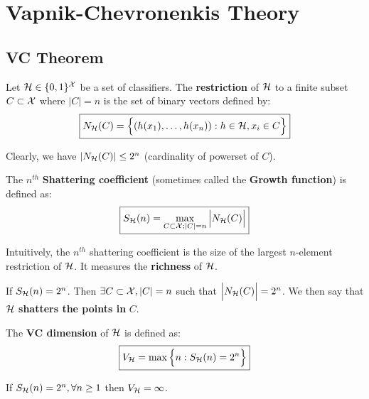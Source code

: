 \newpage\section{Vapnik-Chevronenkis Theory}
\subsection{VC Theorem}
\begin{definition}
    Let $\mathcal{H} \in \{0,1\}^{\mathcal{X}}$ be a set of classifiers. The \textbf{restriction} of $\mathcal{H}$ to a finite subset $C\subset\mathcal{X}$ where $|C| = n$ is the set of binary vectors defined by:
    \begin{align*}
        \boxed{
        N_{\mathcal{H}}(C) = \Big\{ 
            (h(x_1), \dots, h(x_n)) : h\in\mathcal{H}, x_i \in C
         \Big\} 
        }
    \end{align*}

    \noindent Clearly, we have $|N_{\mathcal{H}}(C)| \le 2^n$ (cardinality of powerset of $C$).
\end{definition}

\begin{definition}
    The $n^{th}$ \textbf{Shattering coefficient} (sometimes called the \textbf{Growth function}) is defined as:
    \begin{align*}
        \boxed{S_{\mathcal{H}}(n) = \max_{C\subset\mathcal{X}; |C|=n} \Big| N_{\mathcal{H}} (C) \Big|}
    \end{align*}

    \noindent Intuitively, the $n^{th}$ shattering coefficient is the size of the largest $n$-element restriction of $\mathcal{H}$. It measures the \textbf{richness} of $\mathcal{H}$.

    \noindent\newline If $S_{\mathcal{H}}(n)=2^n$. Then $\exists C\subset\mathcal{X}, |C|=n$ such that $\Big| N_{\mathcal{H}}(C) \Big|=2^n$. We then say that $\mathcal{H}$ \textbf{shatters the points in} $C$.
\end{definition}

\begin{definition}[VC-dimension ($V_\Hf$)]
    The \textbf{VC dimension} of $\mathcal{H}$ is defined as:
    \begin{align*}
        \boxed{V_{\mathcal{H}} = \max\Big\{ 
            n : S_{\mathcal{H}} (n) = 2^n
         \Big\}}
    \end{align*}

    \noindent If $S_{\mathcal{H}}(n)=2^n, \forall n \ge 1$ then $V_{\mathcal{H}}=\infty$.  
\end{definition}

